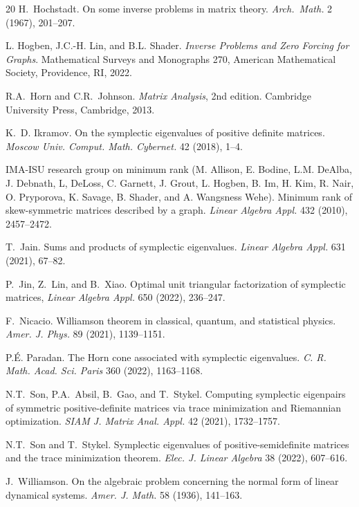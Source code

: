\documentclass[12pt]{article}
\theoremstyle{definition}
\theoremstyle{definition}
\theoremstyle{definition}
\numberwithin{figure}{section}
\numberwithin{equation}{section}
\begin{document}
\begin{thebibliography}{20}
H.~Hochstadt. On some inverse problems in matrix theory.
{\em Arch.~Math.} 2 (1967),  201--207.

 L. Hogben, J.C.-H. Lin, and B.L. Shader.  {\em Inverse Problems and Zero Forcing for Graphs}.   {Mathematical Surveys and Monographs} {270}, American Mathematical Society, Providence, RI,  2022. 

 R.A.~Horn and C.R.~Johnson. {\em Matrix Analysis}, 2nd edition.  Cambridge University Press, Cambridge, 2013.

K.~D. Ikramov. On the symplectic eigenvalues of positive definite matrices.
\emph{Moscow Univ. Comput. Math. Cybernet.}  42 (2018), 1--4.

 IMA-ISU research group on minimum rank (M. Allison, E. Bodine, L.M. DeAlba, J. Debnath, L, DeLoss, C. Garnett, J. Grout, L. Hogben, B. Im, H. Kim, R. Nair, O. Pryporova,
K. Savage, B. Shader, and A. Wangsness Wehe). Minimum rank of skew-symmetric matrices described by a graph. {\it{Linear Algebra Appl.}} 432 (2010), 2457--2472.

T.~Jain. 
Sums and products of symplectic eigenvalues.
{\it Linear Algebra Appl.} 631 (2021),  67–82.



P.~Jin, Z.~Lin, and B.~Xiao.
Optimal unit triangular factorization of symplectic matrices,
{\it Linear Algebra Appl.}
650 (2022), 236--247.

F.~Nicacio.
Williamson theorem in classical, quantum, and statistical physics.
{\it Amer. J. Phys.} 89  (2021), 1139–1151. 

P.\'E. Paradan. The Horn cone associated with symplectic eigenvalues. {\it C. R. Math. Acad. Sci. Paris} 360 (2022), 1163--1168. 

N.T.~Son, P.A.~Absil, B.~Gao, 
and T.~Stykel. Computing symplectic eigenpairs of symmetric positive-definite matrices via trace minimization and Riemannian optimization. {\it SIAM J. Matrix Anal. Appl.} 42 (2021), 1732--1757.

 	N.T.~Son  and T.~Stykel.   Symplectic eigenvalues of positive-semidefinite matrices and the trace minimization theorem. \emph{Elec. J. Linear Algebra} 38 (2022), 607--616.

J.~Williamson. On the algebraic problem concerning the normal form of linear dynamical
systems. \emph{Amer. J. Math.} 58 (1936), 141--163.


\end{thebibliography}
\end{document}
